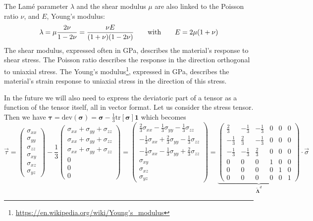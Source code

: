 The Lam\'e parameter $\lambda$ and the shear modulus $\mu$ 
are also linked to the Poisson ratio $\nu$, 
and $E$, Young's modulus:  
\[
\lambda=\mu\frac{2\nu}{1-2\nu}
=\frac{\nu E}{(1+\nu)(1-2\nu)}
\quad\quad
{\rm with}
\quad\quad
E=2\mu(1+\nu)
\]
The shear modulus, expressed often in \si{\giga\pascal}, describes the material's response to shear stress. The Poisson ratio describes the response in the direction orthogonal to uniaxial stress. The Young's modulus\footnote{\url{https://en.wikipedia.org/wiki/Young's_modulus}}, expressed in \si{\giga\pascal}, describes the material's strain response to uniaxial stress in the 
direction of this stress.

In the future we will also need to express the deviatoric part of a tensor as a function of the tensor itself, all in vector format. Let us consider the stress tensor. Then we have ${\bm \tau}=\textrm{dev}({\bm \sigma}) = {\bm \sigma} - \frac{1}{3} \textrm{tr}[ {\bm \sigma} ] {\bm 1}$ which becomes
\[
\vec{\tau}=
\left(
\begin{array}{c}
\sigma_{xx}\\
\sigma_{yy}\\
\sigma_{zz}\\
\sigma_{xy}\\
\sigma_{xz}\\
\sigma_{yz}
\end{array}
\right)
-\frac{1}{3}
\left(
\begin{array}{c}
\sigma_{xx} + \sigma_{yy}+\sigma_{zz} \\
\sigma_{xx} + \sigma_{yy}+\sigma_{zz} \\
\sigma_{xx} + \sigma_{yy}+\sigma_{zz} \\
0 \\
0 \\
0
\end{array}
\right)
\! = \!
\left(
\begin{array}{c}
 \frac23\sigma_{xx}-\frac13 \sigma_{yy}-\frac13 \sigma_{zz} \\
-\frac13\sigma_{xx}+\frac23 \sigma_{yy}-\frac13 \sigma_{zz} \\
-\frac13\sigma_{xx}-\frac13 \sigma_{yy}+\frac23 \sigma_{zz} \\
\sigma_{xy}\\
\sigma_{xz}\\
\sigma_{yz}
\end{array}
\right)
\! = \!
\underbrace{
\left(
\begin{array}{cccccc}
\frac23 & - \frac13 & - \frac13 & 0 & 0 & 0 \\
-\frac13 & \frac23 & - \frac13  & 0 & 0 & 0\\
-\frac13& - \frac13 & \frac23  & 0 & 0 & 0\\
0&0&0& 1&0 &0  \\
0&0&0&0&1 &0\\
0&0&0&0&0& 1
\end{array}
\right)
}_{\tilde{\bm \Lambda}^d}
\cdot
\vec{\sigma}
\]
